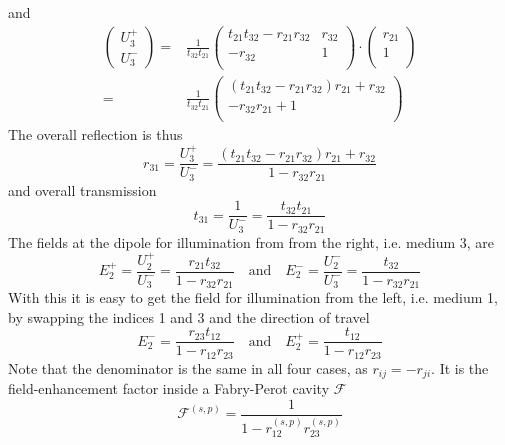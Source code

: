 and 
\begin{align}
\begin{pmatrix}
U_3^+ \\ U_3^-
\end{pmatrix}
= & 
\frac{1}{t_{32} t_{21} }
\begin{pmatrix}
t_{21} t_{32} - r_{21}r_{32} & r_{32} \\ - r_{32} & 1 \\
\end{pmatrix} 
\cdot
\begin{pmatrix}
 r_{21} \\  1 \\
\end{pmatrix}  \\
= & 
\frac{1}{t_{32} t_{21} }
\begin{pmatrix}
(t_{21} t_{32} - r_{21}r_{32})  r_{21} +  r_{32} \\ - r_{32}  r_{21}  + 1 \\
\end{pmatrix} 
\end{align}
The overall reflection is thus
\begin{equation}
 r_{31} = \frac{U_3^+}{U_3^-}
 = \frac{(t_{21} t_{32} - r_{21}r_{32})  r_{21} +  r_{32}}{1 -r_{32}  r_{21}  }
\end{equation}
and overall transmission 
\begin{equation}
 t_{31} = \frac{1}{U_3^-}
 = \frac{t_{32} t_{21}  }{1 -r_{32}  r_{21}  }
\end{equation}
The fields at the dipole for illumination from from the right, i.e. medium 3, are
\begin{equation}
E_2^+ = \frac{U_2^+}{U_3^-} 
= \frac{r_{21} t_{32}  }{1 -r_{32}  r_{21}  }
 \quad
 \text{and}
 \quad
 E_2^- = \frac{U_2^-}{U_3^-} 
  = \frac{t_{32}   }{1 -r_{32}  r_{21}  }
\end{equation}
With this it is easy to get the field for illumination from the left, i.e. medium 1, by swapping the indices 1 and 3 and the direction of travel
\begin{equation}
E_2^- 
= \frac{r_{23} t_{12}  }{1 -r_{12}  r_{23}  }
 \quad
 \text{and}
 \quad
 E_2^+ 
  = \frac{t_{12}   }{1 -r_{12}  r_{23}  }
\end{equation}
Note that the denominator is the same in all four cases, as $r_{ij} = - r_{ji}$. It is the field-enhancement factor inside a Fabry-Perot cavity $\mathcal{F}$
\begin{equation}
\mathcal{F}^{(s,p)} = \frac{1  }{1 -r_{12}^{(s,p)}   r_{23}^{(s,p)}   }
\end{equation}
